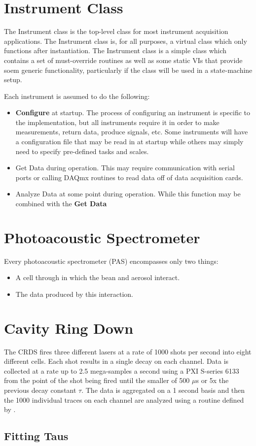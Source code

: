 \documentclass[10pt,twocolumn, twoside, openright]{article}
\begin{document}
\section{Instrument Class}
%
The Instrument class is the top-level class for most instrument acquisition applications.  The Instrument class is, for all purposes, a virtual class which only functions after instantiation.  The Instrument class is a simple class which contains a set of must-override routines as well as some static VIs that provide soem generic functionality, particularly if the class will be used in a state-machine setup. \par
%
Each instrument is assumed to do the following:
%
\begin{itemize}
\item \textbf{Configure} at startup.  The process of configuring an instrument is specific to the implementation, but all instruments require it in order to make measurements, return data, produce signals, etc.  Some instruments will have a configuration file that may be read in at startup while others may simply need to specify pre-defined tasks and scales.
\item {Get Data} during operation.  This may require communication with serial ports or calling DAQmx routines to read data off of data acquisition cards.
\item {Analyze Data} at some point during operation.  While this function may be combined with the \textbf{Get Data}
\end{itemize}
%
\section{Photoacoustic Spectrometer}
%
Every photoacoustic spectrometer (PAS) encompasses only two things:
\begin{itemize}
	\item A cell through in which the bean and aerosol interact.
	\item The data produced by this interaction.
\end{itemize}

\section{Cavity Ring Down}
%
The CRDS fires three different lasers at a rate of 1000 shots per second into eight different cells.  Each shot results in a single decay on each channel.  Data is collected at a rate up to 2.5 mega-samples a second using a PXI S-series 6133 from the point of the shot being fired until the smaller of 500 $\mu$s or 5x the previous decay constant $\tau$.  The data is aggregated on a 1 second basis and then the 1000 individual traces on each channel are analyzed using a routine defined by \citet{}. \par
\subsection{Fitting Taus}
%
\end{document}

